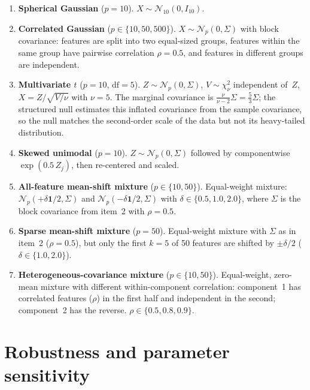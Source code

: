 \documentclass[hidelinks]{siamart251216}
\begin{document}
\begin{enumerate}
\item \textbf{Spherical Gaussian} ($p = 10$).  $X \sim \mathcal{N}_{10}(0, I_{10})$.

\item \textbf{Correlated Gaussian} ($p \in \{10, 50, 500\}$).
$X \sim \mathcal{N}_p(0, \Sigma)$ with block covariance: features are
split into two equal-sized groups, features within the same group have
pairwise correlation $\rho = 0.5$, and features in different groups are
independent.

\item \textbf{Multivariate $t$} ($p = 10$, $\mathrm{df} = 5$).
$Z \sim \mathcal{N}_p(0, \Sigma)$, $V \sim \chi^2_\nu$ independent of~$Z$,
$X = Z / \sqrt{V/\nu}$ with $\nu = 5$.  The marginal covariance is
$\frac{\nu}{\nu - 2}\Sigma = \tfrac{5}{3}\Sigma$; the structured null
estimates this inflated covariance from the sample covariance, so the
null matches the second-order scale of the data but not its heavy-tailed
distribution.

\item \textbf{Skewed unimodal} ($p = 10$).  $Z \sim \mathcal{N}_p(0,
\Sigma)$ followed by componentwise $\exp(0.5\, Z_j)$, then re-centered
and scaled.

\item \textbf{All-feature mean-shift mixture} ($p \in \{10, 50\}$).
Equal-weight mixture: $\mathcal{N}_p(+\delta \mathbf{1}/2, \Sigma)$ and
$\mathcal{N}_p(-\delta \mathbf{1}/2, \Sigma)$ with
$\delta \in \{0.5, 1.0, 2.0\}$, where $\Sigma$ is the block covariance
from item~2 with $\rho = 0.5$.

\item \textbf{Sparse mean-shift mixture} ($p = 50$).  Equal-weight
mixture with $\Sigma$ as in item~2 ($\rho = 0.5$), but only the first
$k = 5$ of 50 features are shifted by $\pm \delta / 2$
($\delta \in \{1.0, 2.0\}$).

\item \textbf{Heterogeneous-covariance mixture} ($p \in \{10, 50\}$).
Equal-weight, zero-mean mixture with different within-component
correlation: component~1 has correlated features ($\rho$) in the first
half and independent in the second; component~2 has the reverse.
$\rho \in \{0.5, 0.8, 0.9\}$.
\end{enumerate}


\section{Robustness and parameter sensitivity}\label{sm:robustness}
\end{document}
